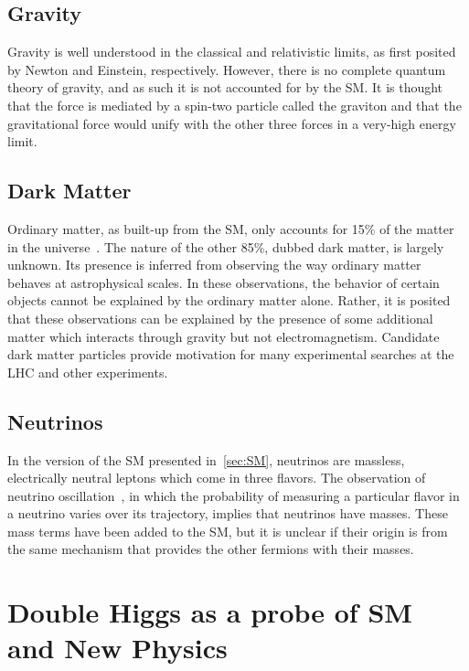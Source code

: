 \subsection{Gravity\label{subsec:grav}}

Gravity is well understood in the classical and relativistic limits, as first posited by Newton
and Einstein, respectively. However, there is no complete quantum theory of gravity, and as such
it is not accounted for by the SM. It is thought that the force is mediated by a spin-two particle
called the graviton and that the gravitational force would unify with the other three forces
in a very-high energy limit.

\subsection{Dark Matter\label{subsec:dark}}

Ordinary matter, as built-up from the SM, only accounts for 15\% of the
matter in the universe~\cite{Clowe:2006eq}. The nature of the other 85\%, dubbed dark matter, is
largely unknown. Its presence is inferred from observing the way ordinary matter behaves at
astrophysical scales. In these observations, the behavior of certain objects cannot be explained
by the ordinary matter alone. Rather, it is posited that these observations can be explained by
the presence of some additional matter which interacts through gravity but not electromagnetism.
Candidate dark matter particles provide motivation for many experimental searches at the LHC and
other experiments.

\subsection{Neutrinos\label{subsec:neu}}

In the version of the SM presented in~\ref{sec:SM}, neutrinos are massless, electrically neutral
leptons which come in three flavors. The observation of neutrino oscillation~\cite{Fukuda:1998mi},
in which the probability of measuring a particular flavor in a neutrino varies over its trajectory,
implies that neutrinos have masses. These mass terms have been added to the SM, but it is
unclear if their origin is from the same mechanism that provides the other fermions with their
masses.

\section{Double Higgs as a probe of SM and New Physics\label{sec:diHiggs}}

